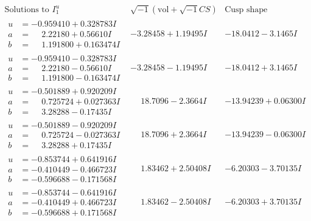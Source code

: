 \documentclass[1p]{elsarticle_modified}
\theoremstyle{definition}
\newcommand{\I}{\sqrt{-1}}
\begin{document}
$$\begin{array}{c|c|c}  
\text{Solutions to }I^u_{1}& \I (\text{vol} + \sqrt{-1}CS) & \text{Cusp shape}\\
 \hline 
\begin{aligned}
u &= -0.959410 + 0.328783 I \\
a &= \phantom{-}2.22180 + 0.56610 I \\
b &= \phantom{-}1.191800 + 0.163474 I\end{aligned}
 & -3.28458 + 1.19495 I & -18.0412 - 3.1465 I \\ \hline\begin{aligned}
u &= -0.959410 - 0.328783 I \\
a &= \phantom{-}2.22180 - 0.56610 I \\
b &= \phantom{-}1.191800 - 0.163474 I\end{aligned}
 & -3.28458 - 1.19495 I & -18.0412 + 3.1465 I \\ \hline\begin{aligned}
u &= -0.501889 + 0.920209 I \\
a &= \phantom{-}0.725724 + 0.027363 I \\
b &= \phantom{-}3.28288 - 0.17435 I\end{aligned}
 & \phantom{-}18.7096 - 2.3664 I & -13.94239 + 0.06300 I \\ \hline\begin{aligned}
u &= -0.501889 - 0.920209 I \\
a &= \phantom{-}0.725724 - 0.027363 I \\
b &= \phantom{-}3.28288 + 0.17435 I\end{aligned}
 & \phantom{-}18.7096 + 2.3664 I & -13.94239 - 0.06300 I \\ \hline\begin{aligned}
u &= -0.853744 + 0.641916 I \\
a &= -0.410449 - 0.466723 I \\
b &= -0.596688 - 0.171568 I\end{aligned}
 & \phantom{-}1.83462 + 2.50408 I & -6.20303 - 3.70135 I \\ \hline\begin{aligned}
u &= -0.853744 - 0.641916 I \\
a &= -0.410449 + 0.466723 I \\
b &= -0.596688 + 0.171568 I\end{aligned}
 & \phantom{-}1.83462 - 2.50408 I & -6.20303 + 3.70135 I \\ \hline\begin{aligned}

\end{aligned}
\end{array}$$
\end{document}
